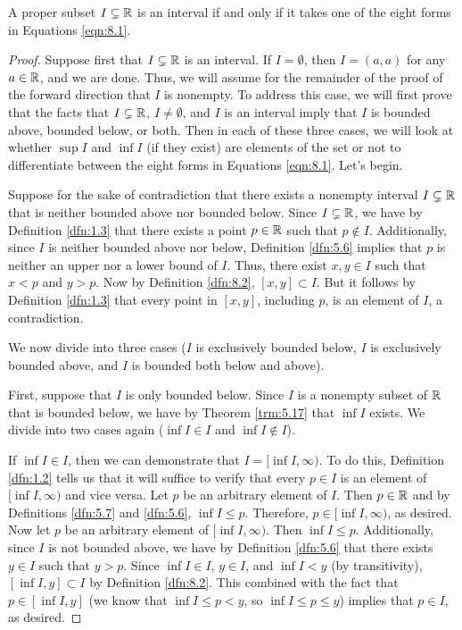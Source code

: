 \documentclass[../main.tex]{subfiles}
\begin{document}
\begin{lemma}\label{lem:8.3}
    A proper subset $I\subsetneq\mathbb{R}$ is an interval if and only if it takes one of the eight forms in Equations \ref{eqn:8.1}.
    \begin{proof}
        Suppose first that $I\subsetneq\mathbb{R}$ is an interval. If $I=\emptyset$, then $I=(a,a)$ for any $a\in\mathbb{R}$, and we are done. Thus, we will assume for the remainder of the proof of the forward direction that $I$ is nonempty. To address this case, we will first prove that the facts that $I\subsetneq\mathbb{R}$, $I\neq\emptyset$, and $I$ is an interval imply that $I$ is bounded above, bounded below, or both. Then in each of these three cases, we will look at whether $\sup I$ and $\inf I$ (if they exist) are elements of the set or not to differentiate between the eight forms in Equations \ref{eqn:8.1}. Let's begin.\par\medskip
        Suppose for the sake of contradiction that there exists a nonempty interval $I\subsetneq\mathbb{R}$ that is neither bounded above nor bounded below. Since $I\subsetneq\mathbb{R}$, we have by Definition \ref{dfn:1.3} that there exists a point $p\in\mathbb{R}$ such that $p\notin I$. Additionally, since $I$ is neither bounded above nor below, Definition \ref{dfn:5.6} implies that $p$ is neither an upper nor a lower bound of $I$. Thus, there exist $x,y\in I$ such that $x<p$ and $y>p$. Now by Definition \ref{dfn:8.2}, $[x,y]\subset I$. But it follows by Definition \ref{dfn:1.3} that every point in $[x,y]$, including $p$, is an element of $I$, a contradiction.\par\medskip
        We now divide into three cases ($I$ is exclusively bounded below, $I$ is exclusively bounded above, and $I$ is bounded both below and above).\par\smallskip
        First, suppose that $I$ is only bounded below. Since $I$ is a nonempty subset of $\mathbb{R}$ that is bounded below, we have by Theorem \ref{trm:5.17} that $\inf I$ exists. We divide into two cases again ($\inf I\in I$ and $\inf I\notin I$).\par
        If $\inf I\in I$, then we can demonstrate that $I=[\inf I,\infty)$. To do this, Definition \ref{dfn:1.2} tells us that it will suffice to verify that every $p\in I$ is an element of $[\inf I,\infty)$ and vice versa. Let $p$ be an arbitrary element of $I$. Then $p\in\mathbb{R}$ and by Definitions \ref{dfn:5.7} and \ref{dfn:5.6}, $\inf I\leq p$. Therefore, $p\in[\inf I,\infty)$, as desired. Now let $p$ be an arbitrary element of $[\inf I,\infty)$. Then $\inf I\leq p$. Additionally, since $I$ is not bounded above, we have by Definition \ref{dfn:5.6} that there exists $y\in I$ such that $y>p$. Since $\inf I\in I$, $y\in I$, and $\inf I<y$ (by transitivity), $[\inf I,y]\subset I$ by Definition \ref{dfn:8.2}. This combined with the fact that $p\in[\inf I,y]$ (we know that $\inf I\leq p<y$, so $\inf I\leq p\leq y$) implies that $p\in I$, as desired.\par

\end{proof}
\end{lemma}
\end{document}
